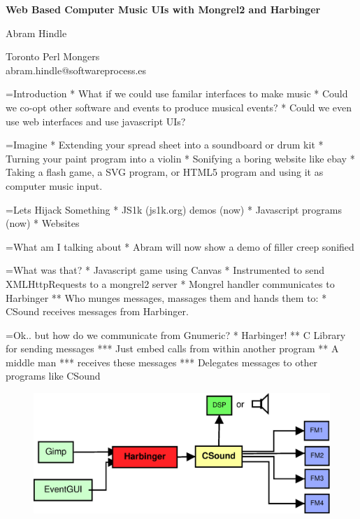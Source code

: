 \documentclass[titlepage,usenames,a4,landscape,semhelv]{seminar}
\author{
\names \\ 
{\small Toronto  Perl Mongers} \\
abram.hindle@softwareprocess.es
}
\newcommand{\gettitle}{Web Based Computer Music UIs with Mongrel2 and Harbinger}
\newcommand{\getmaintitle}{\gettitle}
\newcommand{\names}{Abram Hindle}
\begin{document}
\pagestyle{fancy} %
\begin{slide}

\begin{center}
{\bf \LARGE \getmaintitle }

{\names } 

{\small Toronto Perl Mongers} \\
abram.hindle@softwareprocess.es



\end{center}


=Introduction
* What if we could use familar interfaces to make music
* Could we co-opt other software and events to produce musical events?
* Could we even use web interfaces and use javascript UIs?

=Imagine
* Extending your spread sheet into a soundboard or drum kit
* Turning your paint program into a violin
* Sonifying a boring website like ebay
* Taking a flash game, a SVG program, or HTML5 program and using it as
computer music input.

=Lets Hijack Something
* JS1k (js1k.org) demos (now)
* Javascript programs (now)
* Websites

=What am I talking about
* Abram will now show a demo of filler creep sonified

=What was that?
* Javascript game using Canvas
* Instrumented to send XMLHttpRequests to a mongrel2 server
* Mongrel handler communicates to Harbinger
** Who munges messages, massages them and hands them to:
* CSound receives messages from Harbinger.

=Ok.. but how do we communicate from Gnumeric?
* Harbinger!
** C Library for sending messages
*** Just embed calls from within another program
** A middle man
*** receives these messages
*** Delegates messages to other programs like CSound

\newslide

\begin{figure}
  \centering
\includegraphics[width=\textwidth]{harbinger}  
\end{figure}



\end{slide}
\end{document}
